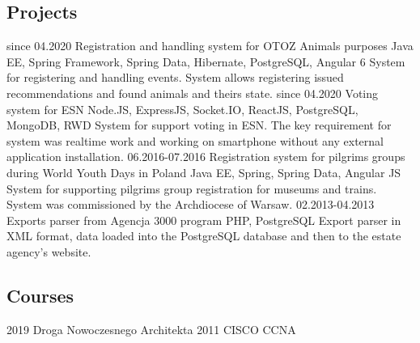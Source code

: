 \documentclass[]{friggeri-cv} %
\begin{document}
	\begin{absolutelynopagebreak}
		\section{Projects}
		\begin{entrylist}
			\entry
			{since 04.2020}
			{Registration and handling system for OTOZ Animals purposes}
			{Java EE, Spring Framework, Spring Data, Hibernate, PostgreSQL, Angular 6}
			{System for registering and handling events. System allows registering issued recommendations and found animals and theirs state.}
			\entry
			{since 04.2020}
			{Voting system for ESN}
			{Node.JS, ExpressJS, Socket.IO, ReactJS, PostgreSQL, MongoDB, RWD}
			{System for support voting in ESN. The key requirement for system was realtime work and working on smartphone without any external application installation.}
			\entry
			{06.2016-07.2016}
			{Registration system for pilgrims groups during World Youth Days in Poland}
			{Java EE, Spring, Spring Data, Angular JS}
			{System for supporting pilgrims group registration for museums and trains. System was commissioned by the Archdiocese of Warsaw.}
			\entry
			{02.2013-04.2013}
			{Exports parser from Agencja 3000 program}
			{PHP, PostgreSQL}
			{Export parser in XML format, data loaded into the PostgreSQL database and then to the estate agency's website.}
		\end{entrylist}
	\end{absolutelynopagebreak}
	
	\begin{absolutelynopagebreak}
		\section{Courses}
		\begin{entrylist}
			\cert
			{2019}
			{Droga Nowoczesnego Architekta}
			\cert
			{2011}
			{CISCO CCNA}
		\end{entrylist}
	\end{absolutelynopagebreak}
	
\end{document}
